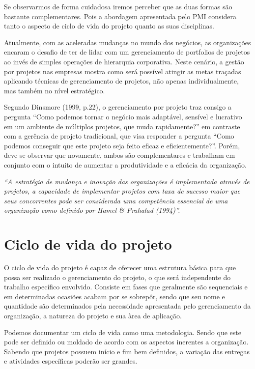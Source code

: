 \documentclass[12pt,a4paper,ruledheader,tocpage=prefix,floatnumber=continuous,pagestart=folhaderosto,font=times]{abnt}
\begin{document}
Se observarmos de forma cuidadosa iremos perceber que as duas formas são bastante complementares. Pois a abordagem apresentada pelo PMI considera tanto
o aspecto de ciclo de vida do projeto quanto as suas disciplinas.

Atualmente, com as aceleradas mudanças no mundo dos negócios, as organizações encaram o desafio de ter de lidar com um gerenciamento de portfolios de projetos
ao invés de simples operações de hierarquia corporativa. Neste cenário, a gestão por projetos nas empresas mostra como será possível atingir as metas traçadas
aplicando técnicas de gerenciamento de projetos, não apenas individualmente, mas também no nível estratégico.

Segundo Dinsmore (1999, p.22), o gerenciamento por projeto traz consigo a pergunta ``Como podemos tornar o negócio mais adaptável, sensível e lucrativo
em um ambiente de múltiplos projetos, que muda rapidamente?'' em contraste com a gerência de projeto tradicional, que visa responder a pergunta ``Como
podemos conseguir que este projeto seja feito eficaz e eficientemente?''. Porém, deve-se observar que novamente, ambos são complementares e trabalham em
conjunto com o intuito de aumentar a produtividade e a eficácia da organização.

\begin{flushright}
\hfill \textit{“A estratégia de mudança e inovação das organizações é implementada 
através de projetos, a capacidade de implementar projetos com taxa de 
sucesso maior que seus concorrentes pode ser considerada uma 
competência essencial de uma organização como definido por Hamel \& Prahalad (1994)”. }
\end{flushright}

\section{Ciclo de vida do projeto}
O ciclo de vida do projeto é capaz de oferecer uma estrutura básica para que possa ser realizado o gerenciamento do projeto, o que será independente do trabalho
específico envolvido. Consiste em fases que geralmente são sequenciais e em determinadas ocasiões acabam por se sobrepôr, sendo que seu nome e quantidade 
são determinados pela necessidade apresentada pelo gerenciamento da organização, a natureza do projeto e sua àrea de aplicação.\cite{pmbok}

Podemos documentar um ciclo de vida como uma metodologia. Sendo que este pode ser definido ou moldado de acordo com os aspectos inerentes a organização.
Sabendo que projetos possuem início e fim bem definidos, a variação das entregas e atividades específicas poderão ser grandes.
\end{document}
